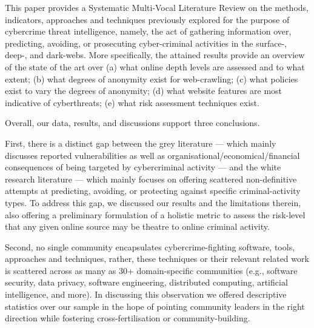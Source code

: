 
This paper provides a Systematic Multi-Vocal Literature Review on the methods, indicators, approaches and techniques previously explored for the purpose of cybercrime threat intelligence, namely, the act of gathering information over, predicting, avoiding, or prosecuting cyber-criminal activities in the surface-, deep-, and dark-webs. More specifically, the attained results provide an overview of the state of the art over (a) what online depth levels are assessed and to what extent; (b) what degrees of anonymity exist for web-crawling; (c) what policies exist to vary the degrees of anonymity; (d) what website features are most indicative of cyberthreats; (e) what risk assessment techniques exist.

Overall, our data, results, and discussions support three conclusions.

First, there is a distinct gap between the grey literature --- which mainly discusses reported vulnerabilities as well as organisational/economical/financial consequences of being targeted by cybercriminal activity --- and the white research literature --- which mainly focuses on offering scattered non-definitive attempts at predicting, avoiding, or protecting against specific criminal-activity types. To address this gap, we discussed our results and the limitations therein, also offering a preliminary formulation of a holistic metric to assess the risk-level that any given online source may be theatre to online criminal activity.

Second, no single community encapsulates cybercrime-fighting software, tools, approaches and techniques, rather, these techniques or their relevant related work is scattered across as many as 30+ domain-specific communities (e.g., software security, data privacy, software engineering, distributed computing, artificial intelligence, and more). In discussing this observation we offered descriptive statistics over our sample in the hope of pointing community leaders in the right direction while fostering cross-fertilisation or community-building.

